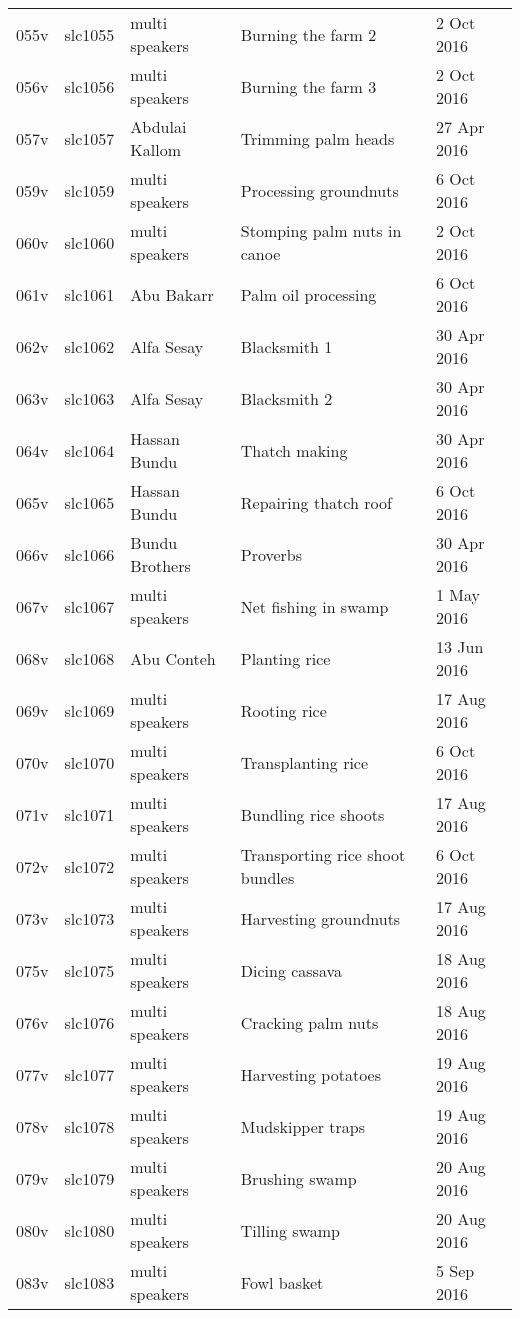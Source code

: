 \begin{xltabular}{\textwidth}{lllQl}
055v & slc1055 & multi speakers & Burning the farm 2 & 2 Oct 2016\\
056v & slc1056 & multi speakers & Burning the farm 3 & 2 Oct 2016\\
057v & slc1057 & Abdulai Kallom & Trimming palm heads & 27 Apr 2016\\
059v & slc1059 & multi speakers & Processing groundnuts & 6 Oct 2016\\
060v & slc1060 & multi speakers & Stomping palm nuts in canoe & 2 Oct 2016\\
061v & slc1061 & Abu Bakarr & Palm oil processing & 6 Oct 2016\\
062v & slc1062 & Alfa Sesay & Blacksmith 1 & 30 Apr 2016\\
063v & slc1063 & Alfa Sesay & Blacksmith 2 & 30 Apr 2016\\
064v & slc1064 & Hassan Bundu & Thatch making & 30 Apr 2016\\
065v & slc1065 & Hassan Bundu & Repairing thatch roof & 6 Oct 2016\\
066v & slc1066 & Bundu Brothers & Proverbs & 30 Apr 2016\\
067v & slc1067 & multi speakers & Net fishing in swamp & 1 May 2016\\
068v & slc1068 & Abu Conteh & Planting rice & 13 Jun 2016\\
069v & slc1069 & multi speakers & Rooting rice & 17 Aug 2016\\
070v & slc1070 & multi speakers & Transplanting rice & 6 Oct 2016\\
071v & slc1071 & multi speakers & Bundling rice shoots & 17 Aug 2016\\
072v & slc1072 & multi speakers & Transporting rice shoot bundles & 6 Oct 2016\\
073v & slc1073 & multi speakers & Harvesting groundnuts & 17 Aug 2016\\
075v & slc1075 & multi speakers & Dicing cassava & 18 Aug 2016\\
076v & slc1076 & multi speakers & Cracking palm nuts & 18 Aug 2016\\
077v & slc1077 & multi speakers & Harvesting potatoes & 19 Aug 2016\\
078v & slc1078 & multi speakers & Mudskipper traps & 19 Aug 2016\\
079v & slc1079 & multi speakers & Brushing swamp & 20 Aug 2016\\
080v & slc1080 & multi speakers & Tilling swamp & 20 Aug 2016\\
083v & slc1083 & multi speakers & Fowl basket & 5 Sep 2016\\

\end{xltabular}
